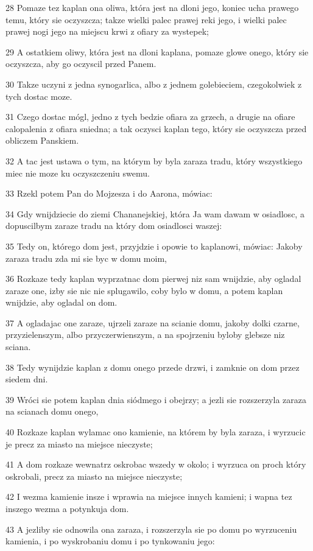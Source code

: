 \par 28 Pomaze tez kaplan ona oliwa, która jest na dloni jego, koniec ucha prawego temu, który sie oczyszcza; takze wielki palec prawej reki jego, i wielki palec prawej nogi jego na miejscu krwi z ofiary za wystepek;
\par 29 A ostatkiem oliwy, która jest na dloni kaplana, pomaze glowe onego, który sie oczyszcza, aby go oczyscil przed Panem.
\par 30 Takze uczyni z jedna synogarlica, albo z jednem golebieciem, czegokolwiek z tych dostac moze.
\par 31 Czego dostac mógl, jedno z tych bedzie ofiara za grzech, a drugie na ofiare calopalenia z ofiara sniedna; a tak oczysci kaplan tego, który sie oczyszcza przed obliczem Panskiem.
\par 32 A tac jest ustawa o tym, na którym by byla zaraza tradu, który wszystkiego miec nie moze ku oczyszczeniu swemu.
\par 33 Rzekl potem Pan do Mojzesza i do Aarona, mówiac:
\par 34 Gdy wnijdziecie do ziemi Chananejskiej, która Ja wam dawam w osiadlosc, a dopuscilbym zaraze tradu na który dom osiadlosci waszej:
\par 35 Tedy on, którego dom jest, przyjdzie i opowie to kaplanowi, mówiac: Jakoby zaraza tradu zda mi sie byc w domu moim,
\par 36 Rozkaze tedy kaplan wyprzatnac dom pierwej niz sam wnijdzie, aby ogladal zaraze one, izby sie nic nie splugawilo, coby bylo w domu, a potem kaplan wnijdzie, aby ogladal on dom.
\par 37 A ogladajac one zaraze, ujrzeli zaraze na scianie domu, jakoby dolki czarne, przyzielenszym, albo przyczerwienszym, a na spojrzeniu byloby glebsze niz sciana.
\par 38 Tedy wynijdzie kaplan z domu onego przede drzwi, i zamknie on dom przez siedem dni.
\par 39 Wróci sie potem kaplan dnia siódmego i obejrzy; a jezli sie rozszerzyla zaraza na scianach domu onego,
\par 40 Rozkaze kaplan wylamac ono kamienie, na którem by byla zaraza, i wyrzucic je precz za miasto na miejsce nieczyste;
\par 41 A dom rozkaze wewnatrz oskrobac wszedy w okolo; i wyrzuca on proch który oskrobali, precz za miasto na miejsce nieczyste;
\par 42 I wezma kamienie insze i wprawia na miejsce innych kamieni; i wapna tez inszego wezma a potynkuja dom.
\par 43 A jezliby sie odnowila ona zaraza, i rozszerzyla sie po domu po wyrzuceniu kamienia, i po wyskrobaniu domu i po tynkowaniu jego:
